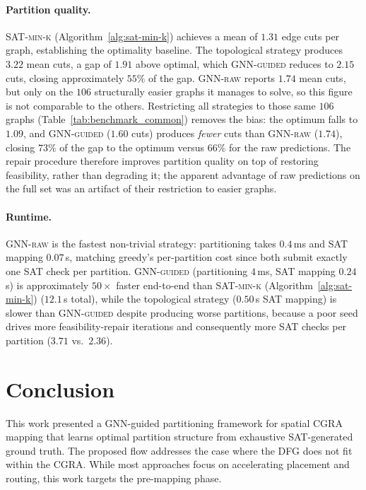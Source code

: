 \documentclass[runningheads]{llncs}
\begin{document}
\paragraph{Partition quality.}
\textsc{SAT-min-k} (Algorithm~\ref{alg:sat-min-k}) achieves a mean of $1.31$ edge cuts per graph, establishing the optimality baseline. The topological strategy produces $3.22$ mean cuts, a gap of $1.91$ above optimal, which \textsc{GNN-guided} reduces to $2.15$ cuts, closing approximately $55\%$ of the gap. \textsc{GNN-raw} reports $1.74$ mean cuts, but only on the $106$ structurally easier graphs it manages to solve, so this figure is not comparable to the others. Restricting all strategies to those same $106$ graphs (Table~\ref{tab:benchmark_common}) removes the bias: the optimum falls to $1.09$, and \textsc{GNN-guided} ($1.60$ cuts) produces \emph{fewer} cuts than \textsc{GNN-raw} ($1.74$), closing $73\%$ of the gap to the optimum versus $66\%$ for the raw predictions. The repair procedure therefore improves partition quality on top of restoring feasibility, rather than degrading it; the apparent advantage of raw predictions on the full set was an artifact of their restriction to easier graphs.

\paragraph{Runtime.}
\textsc{GNN-raw} is the fastest non-trivial strategy: partitioning takes $0.4$\,ms and SAT mapping $0.07$\,s, matching greedy's per-partition cost since both submit exactly one SAT check per partition. \textsc{GNN-guided} (partitioning $4$\,ms, SAT mapping $0.24$\,s) is approximately $50\times$ faster end-to-end than \textsc{SAT-min-k} (Algorithm~\ref{alg:sat-min-k}) ($12.1$\,s total), while the topological strategy ($0.50$\,s SAT mapping) is slower than \textsc{GNN-guided} despite producing worse partitions, because a poor seed drives more feasibility-repair iterations and consequently more SAT checks per partition ($3.71$ vs.\ $2.36$).

\section{Conclusion}

This work presented a GNN-guided partitioning framework for spatial CGRA mapping that learns optimal partition structure from exhaustive SAT-generated ground truth. The proposed flow addresses the case where the DFG does not fit within the CGRA. While most approaches focus on accelerating placement and routing, this work targets the pre-mapping phase.
\end{document}
